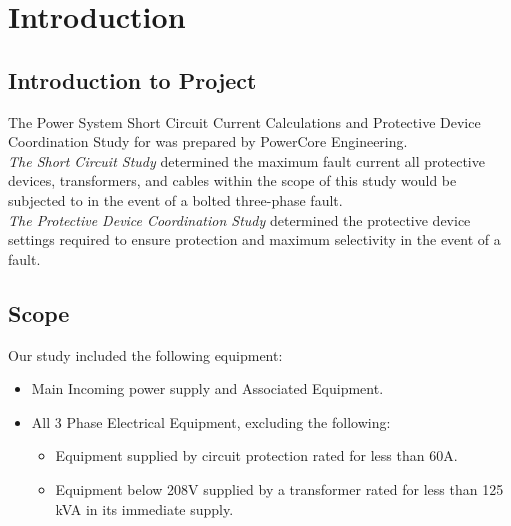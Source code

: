 
\section{Introduction}
\label{af:intro}

\subsection{Introduction to Project}
\label{af:intro:proj}

\noindent The Power System Short Circuit Current Calculations and Protective Device Coordination Study for \Customer{} was prepared by PowerCore Engineering.\\

\noindent \emph{The Short Circuit Study} determined the maximum fault current all protective devices, transformers, and cables within the scope of this study would be
subjected to in the event of a bolted three-phase fault.\\

\noindent \emph{The Protective Device Coordination Study} determined the protective device settings required to ensure protection and maximum selectivity in the event
of a fault.\\

\subsection{Scope}
\label{af:intro:scope}

Our study included the following equipment:
\begin{itemize}
	\item Main Incoming power supply and Associated Equipment.
	\item All 3 Phase Electrical Equipment, excluding the following:
	\begin{itemize}
		\item Equipment supplied by circuit protection rated for less than 60A. 
		\item Equipment below 208V supplied by a transformer rated for less than 125 kVA in its immediate supply.
	\end{itemize}
\end{itemize}


